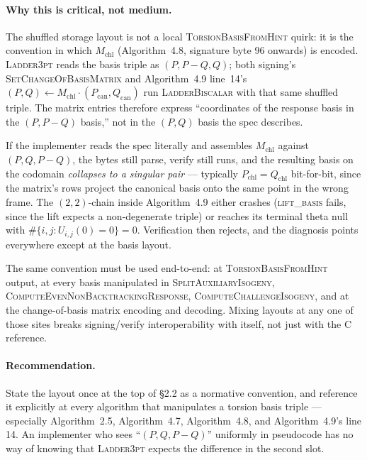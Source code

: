 \documentclass[a4paper,11pt]{article}
\newcommand{\algo}[1]{Algorithm~#1}
\begin{document}
\paragraph{Why this is critical, not medium.}
The shuffled storage layout is not a local
\textsc{TorsionBasisFromHint} quirk: it is the convention in which
$M_{\mathrm{chl}}$ (\algo{4.8}, signature byte 96 onwards) is encoded.
\textsc{Ladder3pt} reads the basis triple as $(P, P{-}Q, Q)$; both
signing's \textsc{SetChangeOfBasisMatrix} and \algo{4.9} line~14's
$(P, Q) \leftarrow M_{\mathrm{chl}} \cdot (P_{\mathrm{can}},
Q_{\mathrm{can}})$ run \textsc{LadderBiscalar} with that same
shuffled triple.  The matrix entries therefore express
``coordinates of the response basis in the $(P, P{-}Q)$ basis,''
not in the $(P, Q)$ basis the spec describes.

If the implementer reads the spec literally and assembles
$M_{\mathrm{chl}}$ against $(P, Q, P{-}Q)$, the bytes still parse,
verify still runs, and the resulting basis on the codomain
\emph{collapses to a singular pair} — typically $P_{\mathrm{chl}} =
Q_{\mathrm{chl}}$ bit-for-bit, since the matrix's rows project the
canonical basis onto the same point in the wrong frame.  The
$(2,2)$-chain inside \algo{4.9} either crashes (\textsc{lift\_basis}
fails, since the lift expects a non-degenerate triple) or reaches
its terminal theta null with $\#\{i, j : U_{i, j}(0) = 0\} = 0$.
Verification then rejects, and the diagnosis points everywhere except
at the basis layout.

The same convention must be used end-to-end: at
\textsc{TorsionBasisFromHint} output, at every basis manipulated in
\textsc{SplitAuxiliaryIsogeny}, \textsc{ComputeEvenNonBacktrackingResponse},
\textsc{ComputeChallengeIsogeny}, and at the change-of-basis matrix
encoding and decoding.  Mixing layouts at any one of those sites
breaks signing/verify interoperability with itself, not just with
the C reference.

\paragraph{Recommendation.}
State the layout once at the top of \S2.2 as a normative convention,
and reference it explicitly at every algorithm that manipulates a
torsion basis triple --- especially \algo{2.5}, \algo{4.7},
\algo{4.8}, and \algo{4.9}'s line 14.  An implementer who sees
``$(P, Q, P{-}Q)$'' uniformly in pseudocode has no way of knowing
that \textsc{Ladder3pt} expects the difference in the second slot.
\end{document}
